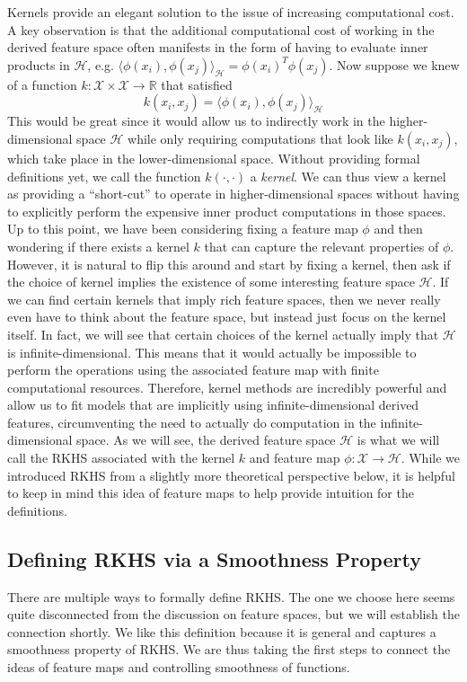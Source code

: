 \documentclass[12pt]{article}
\newcommand{\R}{\mathbb{R}}
\begin{document}
Kernels provide an elegant solution to the issue of increasing computational cost. A key observation is that the additional computational cost of working in the derived feature space often manifests in the form of having to evaluate 
inner products in $\mathcal{H}$, e.g. $\langle \phi(x_i), \phi(x_j) \rangle_{\mathcal{H}} =  \phi(x_i)^T  \phi(x_j)$. Now suppose we knew of a function $k: \mathcal{X} \times \mathcal{X} \to \R$ that satisfied 
\[k(x_i, x_j) = \langle \phi(x_i), \phi(x_j) \rangle_{\mathcal{H}}\]
This would be great since it would allow us to indirectly work in the higher-dimensional space $\mathcal{H}$ while only requiring computations that look like $k(x_i, x_j)$, which take place in the lower-dimensional space. Without providing 
formal definitions yet, we call the function $k(\cdot, \cdot)$ a \textit{kernel}. We can thus view a kernel as providing a ``short-cut'' to operate in higher-dimensional spaces without having to explicitly perform the expensive inner product 
computations in those spaces. Up to this point, we have been considering fixing a feature map $\phi$ and then wondering if there exists a kernel $k$ that can capture the relevant properties of $\phi$. However, it is natural to flip this around 
and start by fixing a kernel, then ask if the choice of kernel implies the existence of some interesting feature space $\mathcal{H}$. If we can find certain kernels that imply rich feature spaces, then we never really even have to think about the 
feature space, but instead just focus on the kernel itself. In fact, we will see that certain choices of the kernel actually imply that $\mathcal{H}$ is infinite-dimensional. This means that it would actually be impossible to perform the operations 
using the associated feature map with finite computational resources. Therefore, kernel methods are incredibly powerful and allow us to fit models that are implicitly using infinite-dimensional derived features, circumventing the need to actually 
do computation in the infinite-dimensional space. As we will see, the derived feature space $\mathcal{H}$ is what we will call the RKHS associated with the kernel $k$ and feature map $\phi: \mathcal{X} \to \mathcal{H}$. While we introduced RKHS from a slightly more theoretical perspective below, it is helpful to keep in mind this idea of feature maps to help provide intuition for the definitions. 

\subsection{Defining RKHS via a Smoothness Property}
There are multiple ways to formally define RKHS. The one we choose here seems quite disconnected from the discussion on feature spaces, but we will establish the connection shortly. We like this definition because it is general and captures 
a smoothness property of RKHS. We are thus taking the first steps to connect the ideas of feature maps and controlling smoothness of functions. 
\end{document}
